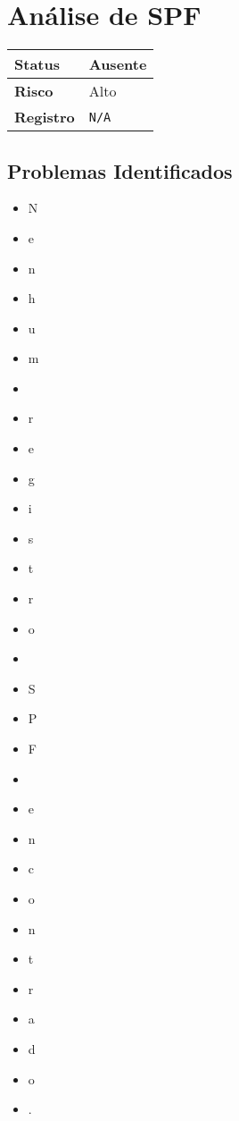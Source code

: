 
    \section{Análise de SPF}
    \begin{tabularx}{\textwidth}{|l|X|}
    \hline
    \textbf{Status} & Ausente \\ \hline
    \textbf{Risco} & Alto \\ \hline
    \textbf{Registro} & \texttt{N/A} \\ \hline
    \end{tabularx}

    \subsection*{Problemas Identificados}
    \begin{itemize}\item N\item e\item n\item h\item u\item m\item  \item r\item e\item g\item i\item s\item t\item r\item o\item  \item S\item P\item F\item  \item e\item n\item c\item o\item n\item t\item r\item a\item d\item o\item .\end{itemize}
    